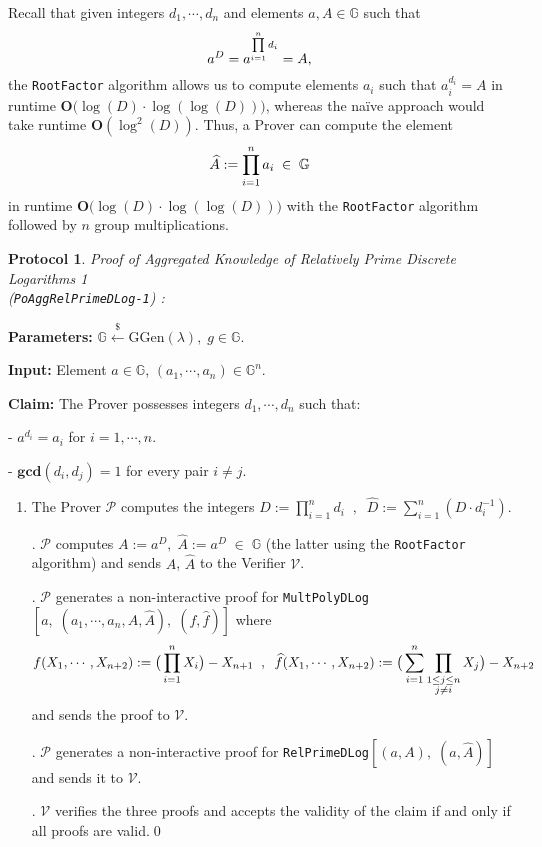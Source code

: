 \documentclass[11pt, lettersize, notitlepage, leqno, footskip=0.6cm]{article}
\newcommand{\pl}{\prod\limits}
\newcommand{\slim}{\sum\limits}
\newcommand{\bG}{\mathbb{G}}
\newcommand{\mc}{\mathcal}
\newcommand{\mb}{\mathbb}
\newcommand{\mbf}{\mathbf}
\newcommand{\mr}{\mathrm}
\newcommand{\lamb}{\lambda}
\newcommand{\what}{\widehat}
\newcommand{\mP}{\mc{P}}
\newcommand{\V}{\mc{V}}
\newcommand{\vs}{\vspace{-0.15cm}}
\newcommand{\noin}{\noindent}
\newcommand{\GCD}{\mbf{gcd}}
\newtheorem{Prot}[Thm]{Protocol}
\numberwithin{equation}{section}
\begin{document}
\noin Recall that given integers $d_1,\cdots,d_n$ and elements $a,A\in\mb{G}$ such that \vs $$a^D = a^{\pl_{i=1}^n d_i} = A ,  \vs $$ the {\tt{RootFactor}} algorithm allows us to compute elements $a_i$ such that $a_i^{d_i} = A$ in runtime $\mbf{O}\big(\log(D) \cdot \log(\log(D))\big)$, whereas the na\"ive approach would take runtime $\mbf{O}(\log^2(D))$. Thus, a Prover can compute the element \vs $$\what{A}:= \pl_{i=1}^n a_i\;\in\;\bG \vs $$ in runtime $\mbf{O}\big(\log(D) \cdot \log(\log(D))\big)$ with the {\tt{RootFactor}} algorithm followed by $n$ group multiplications.

\vspace{0.2cm}

\begin{Prot} \normalfont \hypertarget{RP1}{\textit{Proof of Aggregated Knowledge of Relatively Prime Discrete Logarithms} 1} \\(\verb|PoAggRelPrimeDLog-1|) :\end{Prot} \vspace{-0.3cm}

\noin \textbf{Parameters:} $\mb{G}\xleftarrow{\$} \mr{GGen}(\lamb), \; g\in \mb{G}$.

\noin \textbf{Input:} Element $a\in\mb{G}$, $(a_1,\cdots,a_n)\in \mb{G}^n$.

\noin \textbf{Claim:} The Prover possesses integers $d_1,\cdots, d_n$ such that:

\noin - $a^{d_i} = a_i$ for $i = 1,\cdots, n$.

\noin - $\GCD(d_i, d_j) = 1$ for every pair $i\neq j$.


\begin{enumerate}[wide, labelwidth=!, labelindent=0pt]\vs \item The Prover $\mP$ computes the integers $D:=\prod_{i=1}^n d_i\;\;,\;\; \what{D}:= \sum_{i=1}^n (D\cdot d_i^{-1}).$

\noin 2. $\mP$ computes $A:= a^D,\;\what{A}:= a^{\what{D}}\;\in\;\bG $ (the latter using the {\tt{RootFactor}} algorithm) and sends $A$, $\what{A}$ to the Verifier $\V$.

\begin{comment}
\noin 3. $\mP$ generates a non-interactive proof for \verb|AggKE-1|$[a,\;(a_1,\cdots,a_n)]$ and sends it to $\V$.

\noin 4. \end{comment}


\noin 3. $\mP$ generates a non-interactive proof for \verb|MultPolyDLog|$[a,\;(a_1,\cdots,a_n,A, \what{A}),\; (f,\what{f})]$ where \vs $$f(X_1,\cdots,X_{n+2}):= \big(\pl_{i=1}^n X_i\big) -X_{n+1}\;\;,\;\;\what{f}(X_1,\cdots, X_{n+2}):= \big(\slim_{i=1}^n \pl_{\substack{1\leq j\leq n \\ j\neq i}} X_j\big) - X_{n+2}\vs $$ and sends the proof to $\V$.

\noin 4. $\mP$ generates a non-interactive proof for \verb|RelPrimeDLog|$[(a,A),\;(a,\what{A})]$ and sends it to $\V$.

\noin 5. $\V$ verifies the three proofs and accepts the validity of the claim if and only if all proofs are valid.\qed \end{enumerate}
\end{document}
